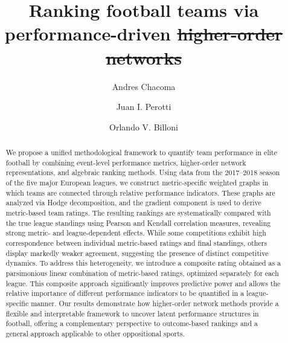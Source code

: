 \documentclass[preprint,12pt]{elsarticle}
\newcommand{\agregar}[1]{{\color{blue}{#1}}}
\newcommand{\sacar}[1]{{\color{red}\sout{#1}}}
\begin{document}
\begin{frontmatter}

\title{Ranking football teams via performance-driven \sacar{higher-order networks} \agregar{HodgeRank decomposition} }

\author[aff1,aff2]{Andres Chacoma}

\author[aff3,aff4]{Juan I. Perotti}

\author[aff3,aff4]{Orlando V. Billoni}


\address[aff1]{Universidad de Buenos Aires, Facultad de Ciencias Exactas y Naturales, Departamento de F\'{i}sica, Buenos Aires, Argentina}

\address[aff2]{CONICET -- Universidad de Buenos Aires, Instituto de F\'{i}sica Interdisciplinaria y Aplicada (INFINA), Buenos Aires, Argentina}

\address[aff3]{Universidad Nacional de C\'{o}rdoba, Facultad de Matem\'{a}tica, Astronom\'{i}a, F\'{i}sica y Computaci\'{o}n, C\'{o}rdoba, Argentina}

\address[aff4]{CONICET -- Universidad Nacional de C\'{o}rdoba, Instituto de F\'{i}sica Enrique Gaviola (IFEG), C\'{o}rdoba, Argentina}


\begin{abstract}
We propose a unified methodological framework to quantify team performance in elite football by combining event-level performance metrics, higher-order network representations, and algebraic ranking methods. Using data from the 2017--2018 season of the five major European leagues, we construct metric-specific weighted graphs in which teams are connected through relative performance indicators. These graphs are analyzed via Hodge decomposition, and the gradient component is used to derive metric-based team ratings. The resulting rankings are systematically compared with the true league standings using Pearson and Kendall correlation measures, revealing strong metric- and league-dependent effects. While some competitions exhibit high correspondence between individual metric-based ratings and final standings, others display markedly weaker agreement, suggesting the presence of distinct competitive dynamics. To address this heterogeneity, we introduce a composite rating obtained as a parsimonious linear combination of metric-based ratings, optimized separately for each league. This composite approach significantly improves predictive power and allows the relative importance of different performance indicators to be quantified in a league-specific manner. Our results demonstrate how higher-order network methods provide a flexible and interpretable framework to uncover latent performance structures in football, offering a complementary perspective to outcome-based rankings and a general approach applicable to other oppositional sports.
\end{abstract}


\end{frontmatter}
\end{document}
